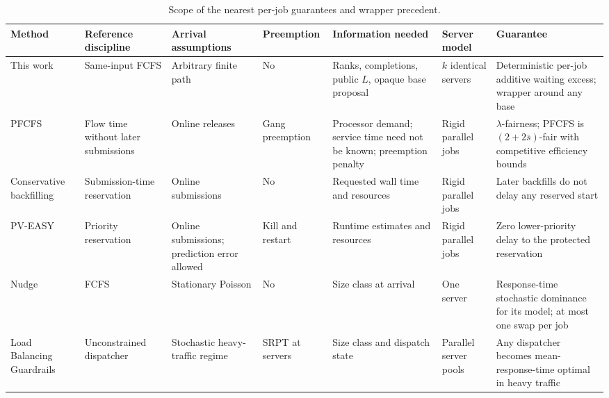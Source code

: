 \begin{table}[htbp]
\centering
\caption{Scope of the nearest per-job guarantees and wrapper precedent.}
\label{tab:supp_related_comparison}
\scriptsize
\setlength{\tabcolsep}{2pt}
\begin{tabular}{>{\raggedright\arraybackslash}p{}>{\raggedright\arraybackslash}p{}>{\raggedright\arraybackslash}p{}>{\raggedright\arraybackslash}p{}>{\raggedright\arraybackslash}p{}>{\raggedright\arraybackslash}p{}>{\raggedright\arraybackslash}p{}}
\hline
Method & Reference discipline & Arrival assumptions & Preemption & Information needed & Server model & Guarantee \\
\hline
This work & Same-input FCFS & Arbitrary finite path & No & Ranks, completions, public $L$, opaque base proposal & $k$ identical servers & Deterministic per-job additive waiting excess; wrapper around any base \\
PFCFS \cite{schwiegelshohn2000fairness} & Flow time without later submissions & Online releases & Gang preemption & Processor demand; service time need not be known; preemption penalty & Rigid parallel jobs & $\lambda$-fairness; PFCFS is $(2+2\bar s)$-fair with competitive efficiency bounds \\
Conservative backfilling \cite{lindsay2013backfilling} & Submission-time reservation & Online submissions & No & Requested wall time and resources & Rigid parallel jobs & Later backfills do not delay any reserved start \\
PV-EASY \cite{yuan2010pveasy,yuan2014strictfairness} & Priority reservation & Online submissions; prediction error allowed & Kill and restart & Runtime estimates and resources & Rigid parallel jobs & Zero lower-priority delay to the protected reservation \\
Nudge \cite{grosof2021nudge} & FCFS & Stationary Poisson & No & Size class at arrival & One server & Response-time stochastic dominance for its model; at most one swap per job \\
Load Balancing Guardrails \cite{grosof2019guardrails} & Unconstrained dispatcher & Stochastic heavy-traffic regime & SRPT at servers & Size class and dispatch state & Parallel server pools & Any dispatcher becomes mean-response-time optimal in heavy traffic \\
\hline
\end{tabular}
\end{table}

